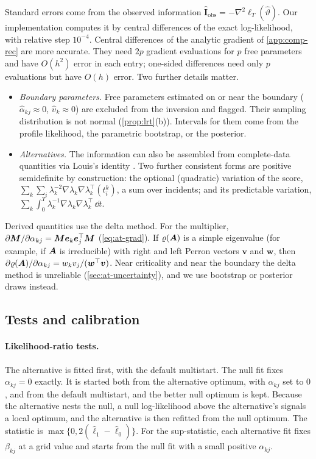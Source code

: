 Standard errors come from the observed information
$\hat{\bm I}_{\mathrm{obs}}=-\nabla^2\ell_T(\hat\vartheta)$. Our implementation computes it
by central differences of the exact log-likelihood, with relative step $10^{-4}$.
Central differences of the analytic gradient of \cref{app:comp-rec} are more accurate.
They need $2p$ gradient evaluations for $p$ free parameters and have $O(h^2)$ error in each
entry; one-sided differences need only $p$ evaluations but have $O(h)$ error. Two further
details matter.
\begin{itemize}
  \item \emph{Boundary parameters.} Free parameters estimated on or near the boundary
    ($\hat\alpha_{kj}\approx0$, $\hat\upsilon_k\approx0$) are excluded from the inversion and
    flagged. Their sampling distribution is not normal (\cref{prop:lrt}(b)). Intervals for
    them come from the profile likelihood, the parametric bootstrap, or the posterior.
  \item \emph{Alternatives.} The information can also be assembled from complete-data
    quantities via Louis's identity \citep{louis1982}. Two further consistent forms are
    positive semidefinite by construction: the optional (quadratic) variation of the
    score, $\sum_k\sum_i\lambda_k^{-2}\nabla\lambda_k\nabla\lambda_k^{\top}(t^k_i)$, a sum
    over incidents; and its predictable variation,
    $\sum_k\int_0^T\lambda_k^{-1}\nabla\lambda_k\nabla\lambda_k^{\top}\,\dd t$.
\end{itemize}
Derived quantities use the delta method. For the multiplier,
$\partial\bm{M}/\partial\alpha_{kj}=\bm{M}\bm e_k\bm e_j^{\top}\bm{M}$ (\cref{eq:at-grad}).
If $\varrho(\bm{A})$ is a simple eigenvalue (for example, if $\bm{A}$ is irreducible) with
right and left Perron vectors $\bm v$ and $\bm w$, then
$\partial\varrho(\bm{A})/\partial\alpha_{kj}=w_kv_j/(\bm w^{\top}\bm v)$. Near criticality and
near the boundary the delta method is unreliable (\cref{sec:at-uncertainty}), and we use
bootstrap or posterior draws instead.

\subsection{Tests and calibration}\label{app:comp-tests}

\paragraph{Likelihood-ratio tests.} The alternative is fitted first, with the default
multistart. The null fit fixes $\alpha_{kj}=0$ exactly. It is started both from the
alternative optimum, with $\alpha_{kj}$ set to $0$, and from the default multistart, and
the better null optimum is kept. Because the alternative nests the null, a null
log-likelihood above the alternative's signals a local optimum, and the alternative is then
refitted from the null optimum. The statistic is $\max\{0,2(\hat\ell_1-\hat\ell_0)\}$. For
the sup-statistic, each alternative fit fixes $\beta_{kj}$ at a grid value and starts from
the null fit with a small positive $\alpha_{kj}$.

